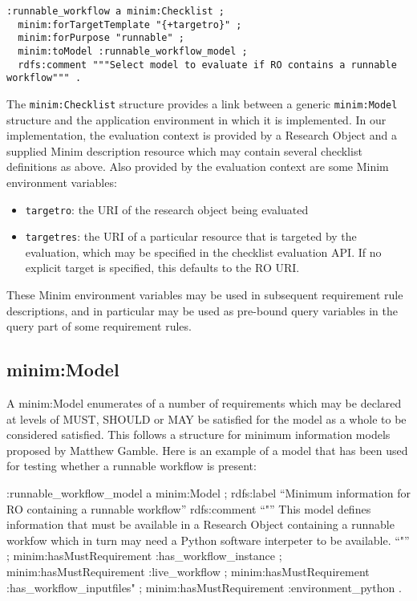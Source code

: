 \documentclass[]{article}
\begin{document}
\begin{verbatim}
:runnable_workflow a minim:Checklist ;
  minim:forTargetTemplate "{+targetro}" ;
  minim:forPurpose "runnable" ;
  minim:toModel :runnable_workflow_model ;
  rdfs:comment """Select model to evaluate if RO contains a runnable workflow""" .
\end{verbatim}

The \texttt{minim:Checklist} structure provides a link between a generic
\texttt{minim:Model} structure and the application environment in which
it is implemented. In our implementation, the evaluation context is
provided by a Research Object and a supplied Minim description resource
which may contain several checklist definitions as above. Also provided
by the evaluation context are some Minim environment variables:

\begin{itemize}
\itemsep1pt\parskip0pt
\item
  \texttt{targetro}: the URI of the research object being evaluated
\item
  \texttt{targetres}: the URI of a particular resource that is targeted
  by the evaluation, which may be specified in the checklist evaluation
  API. If no explicit target is specified, this defaults to the RO URI.
\end{itemize}

These Minim environment variables may be used in subsequent requirement
rule descriptions, and in particular may be used as pre-bound query
variables in the query part of some requirement rules.

\subsection{minim:Model}

A minim:Model enumerates of a number of requirements which may be
declared at levels of MUST, SHOULD or MAY be satisfied for the model as
a whole to be considered satisfied. This follows a structure for minimum
information models proposed by Matthew Gamble. Here is an example of a
model that has been used for testing whether a runnable workflow is
present:

:runnable\_workflow\_model a minim:Model ; rdfs:label ``Minimum
information for RO containing a runnable workflow'' rdfs:comment ``"''
This model defines information that must be available in a Research
Object containing a runnable workfow which in turn may need a Python
software interpeter to be available. ``"'' ; minim:hasMustRequirement
:has\_workflow\_instance ; minim:hasMustRequirement :live\_workflow ;
minim:hasMustRequirement :has\_workflow\_inputfiles" ;
minim:hasMustRequirement :environment\_python .
\end{document}
